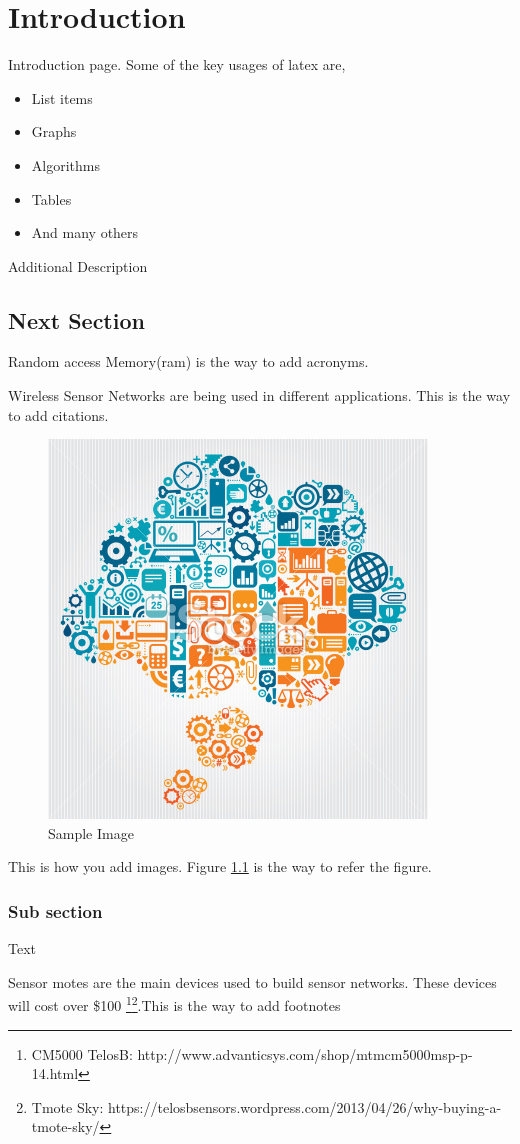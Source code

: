 \chapter{Introduction}

{Introduction page. Some of the key usages of latex are,}

\begin{itemize}
	\item List items
	\item Graphs 
	\item Algorithms
	\item Tables 
	\item And many others
\end{itemize}

{Additional Description}




\section{Next Section}
{Random access Memory(\acrshort{ram}) is the way to add acronyms.}

{Wireless Sensor Networks are being used in different applications\cite{journals/ijdsn/AmeenIK10}. This is the way to add citations.}

\begin{figure}[h,width=0.8\textwidth]
	\centering
	\includegraphics{Images/b}
	\caption{Sample Image}
	\label{fig:image}
\end{figure}


{This is how you add images. Figure \ref{fig:image} is the way to refer the figure.}




\subsection{Sub section}
{Text}


{Sensor motes are the main devices used to build sensor networks. These devices will cost over  \$100 \footnote{CM5000 TelosB: http://www.advanticsys.com/shop/mtmcm5000msp-p-14.html}\footnote{Tmote Sky: https://telosbsensors.wordpress.com/2013/04/26/why-buying-a-tmote-sky/}.This is the way to add footnotes}
